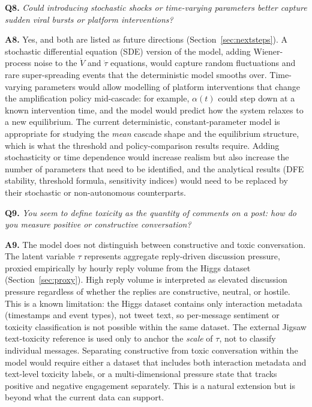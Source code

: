 \documentclass[11pt]{article}
\begin{document}
\bigskip

\noindent\textbf{Q8.} \textit{Could introducing stochastic shocks or time-varying parameters better capture sudden viral bursts or platform interventions?}

\medskip
\noindent\textbf{A8.}
Yes, and both are listed as future directions (Section~\ref{sec:nextsteps}).
A stochastic differential equation (SDE) version of the model, adding Wiener-process noise to the $\dot{V}$ and $\dot{\tau}$ equations, would capture random fluctuations and rare super-spreading events that the deterministic model smooths over.
Time-varying parameters would allow modelling of platform interventions that change the amplification policy mid-cascade: for example, $\alpha(t)$ could step down at a known intervention time, and the model would predict how the system relaxes to a new equilibrium.
The current deterministic, constant-parameter model is appropriate for studying the \emph{mean} cascade shape and the equilibrium structure, which is what the threshold and policy-comparison results require.
Adding stochasticity or time dependence would increase realism but also increase the number of parameters that need to be identified, and the analytical results (DFE stability, threshold formula, sensitivity indices) would need to be replaced by their stochastic or non-autonomous counterparts.

\bigskip

\noindent\textbf{Q9.} \textit{You seem to define toxicity as the quantity of comments on a post: how do you measure positive or constructive conversation?}

\medskip
\noindent\textbf{A9.}
The model does not distinguish between constructive and toxic conversation.
The latent variable $\tau$ represents aggregate reply-driven discussion pressure, proxied empirically by hourly reply volume from the Higgs dataset (Section~\ref{sec:proxy}).
High reply volume is interpreted as elevated discussion pressure regardless of whether the replies are constructive, neutral, or hostile.
This is a known limitation: the Higgs dataset contains only interaction metadata (timestamps and event types), not tweet text, so per-message sentiment or toxicity classification is not possible within the same dataset.
The external Jigsaw text-toxicity reference \cite{borkan2019} is used only to anchor the \emph{scale} of $\tau$, not to classify individual messages.
Separating constructive from toxic conversation within the model would require either a dataset that includes both interaction metadata and text-level toxicity labels, or a multi-dimensional pressure state that tracks positive and negative engagement separately. This is a natural extension but is beyond what the current data can support.
\end{document}
